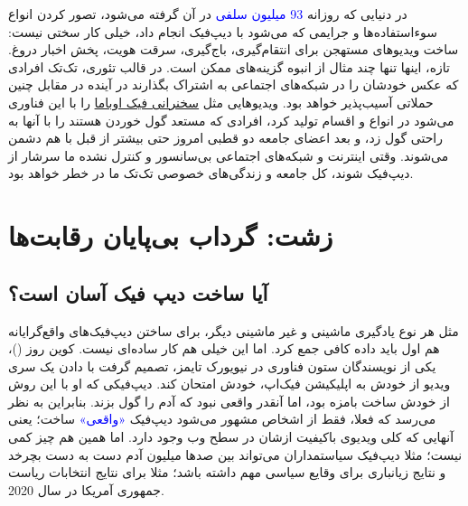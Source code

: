 \documentclass[12pt,a4paper]{report}
\begin{document}
 	در دنیایی که روزانه \textcolor{blue}{93 میلیون سلفی} در آن گرفته می‌شود، تصور کردن انواع سوءاستفاده‌ها و جرایمی که می‌شود با دیپ‌فیک انجام داد، خیلی کار سختی نیست: ساخت ویدیوهای مستهجن برای انتقام‌گیری، باج‌گیری، سرقت هویت، پخش اخبار دروغ. تازه، اینها تنها چند مثال از انبوه گزینه‌های ممکن است. در قالب تئوری، تک‌تک افرادی که عکس خودشان را در شبکه‌های اجتماعی به اشتراک بگذارند در آینده در مقابل چنین حملاتی آسیب‌پذیر خواهد بود. ویدیوهایی مثل \href{https://youtu.be/cQ54GDm1eL0}{سخنرانی فیک اوباما} را با این فناوری می‌شود در انواع و اقسام تولید کرد، افرادی که مستعد گول خوردن هستند را با آنها به راحتی گول زد، و بعد اعضای جامعه دو قطبی امروز حتی بیشتر از قبل با هم دشمن می‌شوند. وقتی اینترنت و شبکه‌های اجتماعی بی‌سانسور و کنترل نشده ما سرشار از دیپ‌فیک شوند، کل جامعه و زندگی‌های خصوصی تک‌تک ما در خطر خواهد بود.
 	

 	
\chapter{زشت: گرداب بی‌پایان رقابت‌ها}\label{فصل سوم}
\section{آیا ساخت دیپ فیک آسان است؟}
 	مثل هر نوع یادگیری ماشینی و غیر ماشینی دیگر، برای ساختن دیپ‌فیک‌های واقع‌گرایانه هم اول باید داده کافی جمع کرد. اما این خیلی هم کار ساده‌ای نیست. کوین روز ()، یکی از نویسندگان ستون فناوری در نیویورک تایمز، تصمیم گرفت با دادن یک سری ویدیو از خودش به اپلیکیشن فیک‌اپ، خودش امتحان کند. دیپ‌فیکی که او با این روش از خودش ساخت بامزه بود، اما آنقدر واقعی نبود که آدم را گول بزند. بنابراین به نظر می‌رسد که فعلا، فقط از اشخاص مشهور می‌شود دیپ‌فیک   \textcolor{blue}{«واقعی» }ساخت؛ یعنی آنهایی که کلی ویدیوی باکیفیت ازشان در سطح وب وجود دارد. اما همین هم چیز کمی نیست؛ مثلا دیپ‌فیک‌ سیاستمداران می‌تواند بین صدها میلیون آدم دست به دست بچرخد و نتایج زیانباری برای وقایع سیاسی مهم داشته باشد؛ مثلا برای نتایج انتخابات ریاست جمهوری آمریکا در سال 2020.
\end{document}

